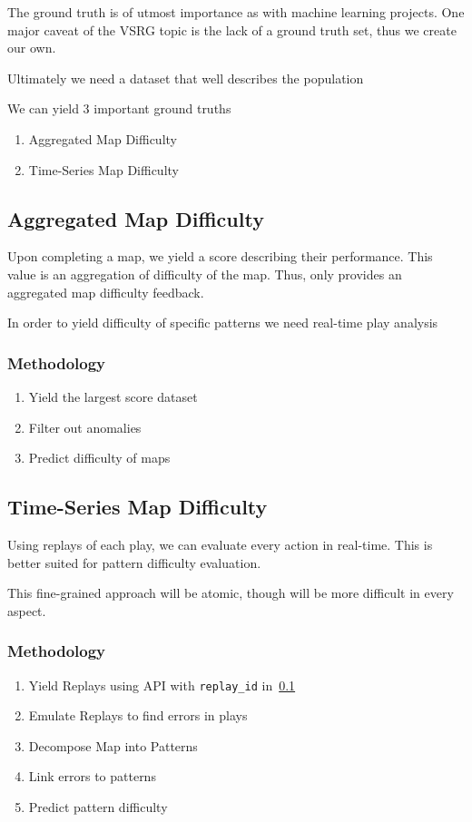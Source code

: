 The ground truth is of utmost importance as with machine learning projects.
One major caveat of the VSRG topic is the lack of a ground truth set, thus we create our own.

Ultimately we need a dataset that well describes the population

We can yield 3 important ground truths

\begin{enumerate}
    \item Aggregated Map Difficulty
    \item Time-Series Map Difficulty
\end{enumerate}

\subsection{Aggregated Map Difficulty}\label{subsec:aggregated-map-difficulty}

Upon completing a map, we yield a score describing their performance.
This value is an aggregation of difficulty of the map.
Thus, only provides an aggregated map difficulty feedback.

In order to yield difficulty of specific patterns we need real-time play analysis

\subsubsection*{Methodology}

\begin{enumerate}
    \item Yield the largest score dataset
    \item Filter out anomalies
    \item Predict difficulty of maps
\end{enumerate}

\subsection{Time-Series Map Difficulty}\label{subsec:time-series-map-difficulty}

Using replays of each play, we can evaluate every action in real-time.
This is better suited for pattern difficulty evaluation.

This fine-grained approach will be atomic, though will be more
difficult in every aspect.

\subsubsection*{Methodology}

\begin{enumerate}
    \item Yield Replays using API with \verb+replay_id+ in~\ref{subsec:aggregated-map-difficulty}
    \item Emulate Replays to find errors in plays
    \item Decompose Map into Patterns
    \item Link errors to patterns
    \item Predict pattern difficulty
\end{enumerate}